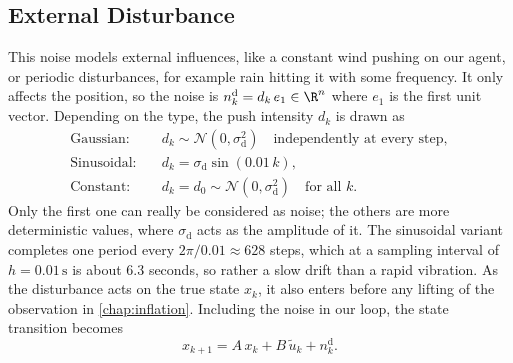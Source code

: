 \subsection{External Disturbance}
\label{subsec:external-disturbance}

This noise models external influences, like a constant wind pushing on our
agent, or periodic disturbances, for example rain
hitting it with some frequency. It only affects the position, so
the noise is $n^{\mathrm{d}}_k = d_k\, e_1 \in \R^{n}$ where $e_1$ is the first unit vector.
Depending on the type, the push intensity $d_k$ is drawn as
\begin{subequations}
\label{eq:disturbance-noise}
\begin{align}
    \text{Gaussian:} \quad
        & d_k \sim \mathcal{N}\!\left(0, \sigma_{\mathrm{d}}^{2}\right)
          \quad \text{independently at every step}, \label{eq:dist-gauss}\\
    \text{Sinusoidal:} \quad
        & d_k = \sigma_{\mathrm{d}} \sin(0.01\,k) , \label{eq:dist-sin}\\
    \text{Constant:} \quad
        & d_k = d_0 \sim \mathcal{N}\!\left(0, \sigma_{\mathrm{d}}^{2}\right)
          \quad \text{for all } k . \label{eq:dist-const}
\end{align}
\end{subequations}
Only the first one can really be considered as noise; the others are more
deterministic values, where $\sigma_{\mathrm{d}}$ acts as the amplitude of it. 
The sinusoidal variant completes one period every
$2\pi / 0.01 \approx 628$ steps, which at a sampling interval of $h = 0.01\,\mathrm{s}$ 
is about $6.3$ seconds, so rather a slow drift than a rapid vibration.
As the disturbance acts on the true state $x_k$, it also enters before any
lifting of the observation in \cref{chap:inflation}. Including the
noise in our loop, the state transition becomes
\begin{equation}
    \label{eq:disturbance-step}
    x_{k+1} = A\, x_k + B\, \tilde{u}_k + n^{\mathrm{d}}_k .
\end{equation}
